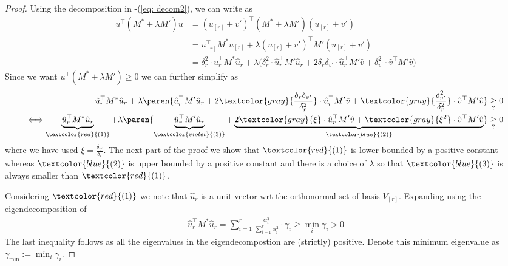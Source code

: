 \begin{proof}
    Using the decomposition in -(\ref{eq: decom2}), we can write  as
    \begin{align}
        u^{\top}(M^* + \lambda M')u &= (u_{[r]} + v')^{\top}(M^* + \lambda M')(u_{[r]} + v') \nonumber\\
        &= u_{[r]}^{\top} M^*u_{[r]} + \lambda (u_{[r]} + v')^{\top}M'(u_{[r]} + v')\nonumber\\
        & = \delta_r^2 \cdot\hat{u}_r^{\top}M^*\hat{u}_r + \lambda\big( \delta_r^2 \cdot\hat{u}_r^{\top}M'\hat{u}_r + 2 \delta_r \delta_{v'}\cdot \hat{u}_r^{\top} M' \hat{v} + \delta^2_{v'}\cdot \hat{v}^{\top}M'\hat{v} \big) \label{eq: eq1}
    \end{align}
    Since we want $u^{\top}(M^* + \lambda M') \ge 0$ we can further simplify  as 
    \begin{align}
        \hat{u}_r^{\top}M^*\hat{u}_r + \lambda\paren{ \hat{u}_r^{\top}M'\hat{u}_r + 2 \textcolor{gray}{\frac{\delta_r\delta_{v'}}{\delta_r^2 }} \cdot \hat{u}_r^{\top} M' \hat{v} + \textcolor{gray}{\frac{\delta^2_{v'}}{\delta^2_r}}\cdot \hat{v}^{\top}M'\hat{v} } \underset{?}{\ge} 0 \label{eq: equiv1}\\
        \Longleftrightarrow \underbrace{\hat{u}_r^{\top}M^*\hat{u}_r}_{\textcolor{red}{(1)}} + \lambda\paren{ \underbrace{\hat{u}_r^{\top}M'\hat{u}_r}_{\textcolor{violet}{(3)}} + \underbrace{2 \textcolor{gray}{\xi}\cdot \hat{u}_r^{\top} M' \hat{v} + \textcolor{gray}{\xi^2}\cdot \hat{v}^{\top}M'\hat{v} }_{\textcolor{blue}{(2)}}} \underset{?}{\ge} 0 \label{eq: equiv2}
    \end{align}
    where we have used $\xi = \frac{\delta_{v'}}{\delta_r}$. The next part of the proof we show that $\textcolor{red}{(1)}$ is lower bounded by a positive constant whereas $\textcolor{blue}{(2)}$ is upper bounded by a positive constant and there is a choice of $\lambda$ so that $\textcolor{blue}{(3)}$ is always smaller than $\textcolor{red}{(1)}$.
    
    Considering $\textcolor{red}{(1)}$ we note that $\hat{u}_r$ is a unit vector wrt the orthonormal set of basis $V_{[r]}$. Expanding using the eigendecomposition of 
    \begin{align*}
        \hat{u}_r^{\top}M^*\hat{u}_r = \sum_{i=1}^r \frac{\alpha^2_i}{\sum_{i=1}^r \alpha_i^2}\cdot \gamma_i \ge \min_i \gamma_i > 0
    \end{align*}
    The last inequality follows as all the eigenvalues in the eigendecompostion are (strictly) positive. Denote this minimum eigenvalue as $\gamma_{\min} := \min_i \gamma_i$.
    

\end{proof}
